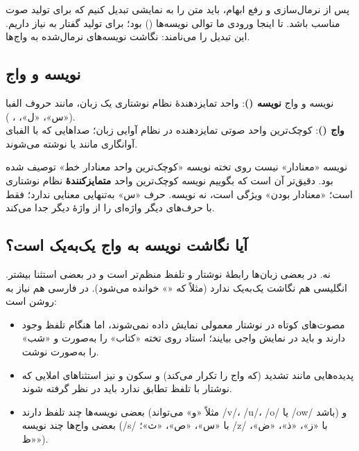 پس از نرمال‌سازی و رفع ابهام، باید متن را به نمایشی تبدیل کنیم که برای تولید صوت مناسب باشد. تا اینجا ورودی ما توالی نویسه‌ها () بود؛ برای تولید گفتار به  نیاز داریم. این تبدیل را  می‌نامند: نگاشت نویسه‌های نرمال‌شده به واج‌ها.

\subsection{نویسه و واج}
\begin{definitionbox}{نویسه و واج}
\textbf{نویسه ()}: واحد تمایزدهندهٔ نظام نوشتاری یک زبان، مانند حروف الفبا («س»، «ل»، ، ). \\
\textbf{واج ()}: کوچک‌ترین واحد صوتی تمایزدهنده در نظام آوایی زبان؛ صداهایی که با الفبای آوانگاری مانند  یا  نوشته می‌شوند.
\end{definitionbox}

\begin{correctionbox}{نویسه «معنادار» نیست}
روی تخته نویسه «کوچک‌ترین واحد معنادار خط» توصیف شده بود. دقیق‌تر آن است که بگوییم نویسه کوچک‌ترین واحد \textbf{متمایزکنندهٔ} نظام نوشتاری است؛ «معنادار بودن» ویژگی  است، نه نویسه. حرف «س» به‌تنهایی معنایی ندارد؛ فقط با حرف‌های دیگر واژه‌ای را از واژهٔ دیگر جدا می‌کند.
\end{correctionbox}

\subsection{آیا نگاشت نویسه به واج یک‌به‌یک است؟}
نه. در بعضی زبان‌ها رابطهٔ نوشتار و تلفظ منظم‌تر است و در بعضی استثنا بیشتر. انگلیسی هم نگاشت یک‌به‌یک ندارد (مثلاً  که «» خوانده می‌شود). در فارسی هم نیاز به  روشن است:
\begin{itemize}
  \item مصوت‌های کوتاه در نوشتار معمولی نمایش داده نمی‌شوند، اما هنگام تلفظ وجود دارند و باید در نمایش واجی بیایند؛ استاد روی تخته «کتاب» را به‌صورت  و «شب» را به‌صورت  نوشت.
  \item پدیده‌هایی مانند تشدید (که واج را تکرار می‌کند) و سکون و نیز استثنا‌های املایی که نوشتار با تلفظ تطابق ندارد باید در نظر گرفته شوند.
  \item بعضی نویسه‌ها چند تلفظ دارند (مثلاً «و» می‌تواند /v/، /u/، /o/ یا /ow/ باشد) و بعضی واج‌ها چند نویسه (/s/ با «س»، «ص»، «ث»؛ /z/ با «ز»، «ذ»، «ض»، «ظ»).
\end{itemize}

